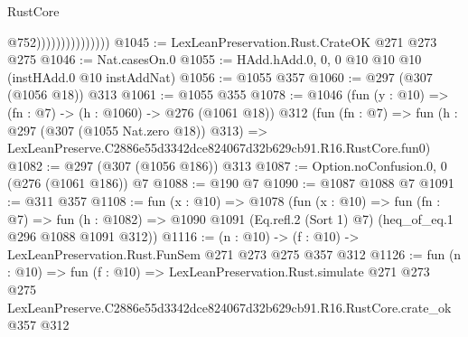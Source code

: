 \begin{lexlean}{RustCore}
\begin{coremodule}
                                  @752)))))))))))))))
@1045 := LexLeanPreservation.Rust.CrateOK @271 @273 @275
@1046 := Nat.casesOn.{0}
@1055 := HAdd.hAdd.{0, 0, 0} @10 @10 @10 (instHAdd.{0} @10 instAddNat)
@1056 := @1055 @357
@1060 := @297 (@307 (@1056 @18)) @313
@1061 := @1055 @355
@1078 := @1046
    (fun (y : @10) => (fn : @7) -> (h : @1060) -> @276 (@1061 @18))
    @312
    (fun (fn : @7) =>
    fun (h : @297 (@307 (@1055 Nat.zero @18)) @313) =>
    LexLeanPreserve.C2886e55d3342dce824067d32b629cb91.R16.RustCore.fun0)
@1082 := @297 (@307 (@1056 @186)) @313
@1087 := Option.noConfusion.{0, 0} (@276 (@1061 @186)) @7
@1088 := @190 @7
@1090 := @1087 @1088 @7
@1091 := @311 @357
@1108 := fun (x : @10) =>
  @1078
    (fun (x : @10) =>
    fun (fn : @7) =>
    fun (h : @1082) => @1090 @1091 (Eq.refl.{2} (Sort 1) @7) (heq_of_eq.{1} @296 @1088 @1091 @312))
@1116 := (n : @10) -> (f : @10) -> LexLeanPreservation.Rust.FunSem @271 @273 @275 @357 @312
@1126 := fun (n : @10) =>
  fun (f : @10) =>
  LexLeanPreservation.Rust.simulate
    @271
    @273
    @275
    LexLeanPreserve.C2886e55d3342dce824067d32b629cb91.R16.RustCore.crate_ok
    @357
    @312
\end{coremodule}
\end{lexlean}
